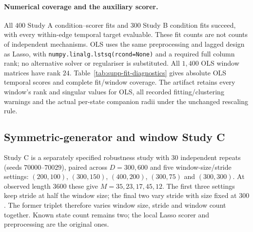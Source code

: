 \documentclass[11pt]{article}
\begin{document}
\paragraph{Numerical coverage and the auxiliary scorer.}
All $400$ Study A condition--scorer fits and $300$ Study B condition fits
succeed, with every within-edge temporal target evaluable. These fit counts are not counts
of independent mechanisms. OLS uses the same preprocessing and lagged design
as Lasso, with \texttt{numpy.linalg.lstsq(rcond=None)} and a required full
column rank; no alternative solver or regulariser is substituted. All
$1{,}400$ OLS window matrices have rank $24$.
Table~\ref{tab:supp-fit-diagnostics} gives absolute OLS temporal scores and
complete fit/window coverage. The artifact retains every window's rank and
singular values for OLS, all recorded fitting/clustering warnings and the
actual per-state companion radii under the unchanged rescaling rule.

\begin{table}[!htbp]
\centering
\setlength{\tabcolsep}{4pt}
\caption{Auxiliary OLS scores and complete numerical diagnostics.
Panel~(a) averages $100$ independent repeats at each duration; gated hard and
forced hard scores coincide. Panel~(b) counts condition--scorer fits and their
window design matrices, not target-wise regressions or independent samples.
Each Study B row combines its three schedules, with the same fifty mechanisms
reused across them. Warnings combine recorded window-fitting and clustering
warnings; no fit failed or OLS matrix failed its rank requirement.}
\label{tab:supp-fit-diagnostics}

\end{table}

\FloatBarrier
\subsection{Symmetric-generator and window Study C}
\label{app:symmetric-sensitivity}
Study C is a separately specified robustness study with 30 independent
repeats (seeds $70000$--$70029$), paired across $D=300,600$ and five
window-size/stride settings: $(200,100)$, $(300,150)$, $(400,200)$,
$(300,75)$ and $(300,300)$. At observed length $3600$ these give $M=35,23,17,45,12$.
The first three settings keep stride at half the window size; the final two
vary stride with size fixed at $300$. The former triplet therefore varies
window size, stride and window count together. Known state count remains two;
the local Lasso scorer and preprocessing are the original ones.
\end{document}
